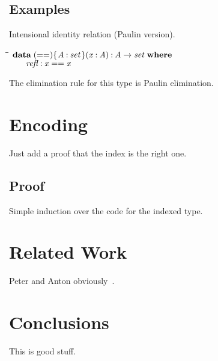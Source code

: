 \documentclass[11pt]{article}
\newlength{\lwidth}\setlength{\lwidth}{4.5cm}
\newlength{\cwidth}\setlength{\cwidth}{8mm} %
\newcommand{\Conid}[1]{\mathit{#1}}
\newcommand{\Varid}[1]{\mathit{#1}}
\begin{document}
\subsection{Examples}

Intensional identity relation (Paulin version).

\begin{tabbing}
\qquad\=\hspace{\lwidth}\=\hspace{\cwidth}\=\+\kill
${\mathbf{data}\;(==)\{\mskip1.5mu \Conid{A}\mathbin{:}\Set\mskip1.5mu\}(\Varid{x}\mathbin{:}\Conid{A})\mathbin{:}\Conid{A}\to \Set\;\mathbf{where}}$\\
${\hskip2.00em\relax\Varid{refl}\mathbin{:}\Varid{x}==\Varid{x}}$
\end{tabbing}
The elimination rule for this type is Paulin elimination.

\section{Encoding}

Just add a proof that the index is the right one.

\subsection{Proof}

Simple induction over the code for the indexed type.

\section{Related Work}

Peter and Anton obviously~\cite{dybjer:indexed-ir}.

\section{Conclusions}

This is good stuff.



\end{document}
